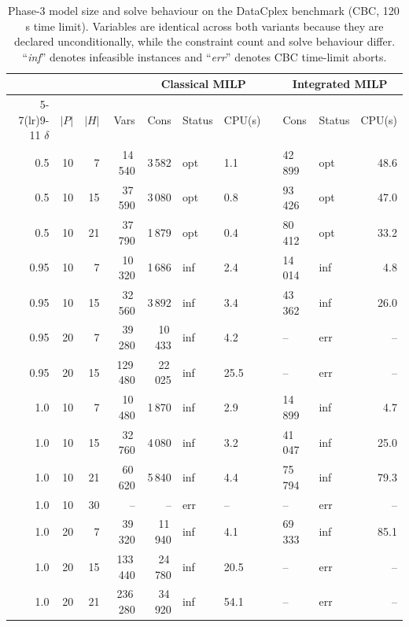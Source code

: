 \begin{table}[t]
\centering\small\setlength{\tabcolsep}{4pt}
\caption{Phase-3 model size and solve behaviour on the DataCplex benchmark
  (CBC, 120\,s time limit).  Variables are identical across both variants
  because they are declared unconditionally, while the constraint count and
  solve behaviour differ.  ``\emph{inf}'' denotes infeasible instances and
  ``\emph{err}'' denotes CBC time-limit aborts.}
\label{tab:phase3_size}
\begin{tabular}{rrrr rll r llr}
\toprule
& & & & \multicolumn{3}{c}{Classical MILP} & & \multicolumn{3}{c}{Integrated MILP} \\
\cmidrule(lr){5-7}\cmidrule(lr){9-11}
$\delta$ & $|P|$ & $|H|$ & Vars & Cons & Status & CPU(s) & & Cons & Status & CPU(s) \\
\midrule
0.5 & 10 &  7 & 14\,540 & 3\,582  & opt & 1.1 & & 42\,899 & opt & 48.6 \\
0.5 & 10 & 15 & 37\,590 & 3\,080  & opt & 0.8 & & 93\,426 & opt & 47.0 \\
0.5 & 10 & 21 & 37\,790 & 1\,879  & opt & 0.4 & & 80\,412 & opt & 33.2 \\
\midrule
0.95& 10 &  7 & 10\,320 & 1\,686  & inf & 2.4 & & 14\,014 & inf &  4.8 \\
0.95& 10 & 15 & 32\,560 & 3\,892  & inf & 3.4 & & 43\,362 & inf & 26.0 \\
0.95& 20 &  7 & 39\,280 & 10\,433 & inf & 4.2 & & --      & err & -- \\
0.95& 20 & 15 & 129\,480& 22\,025 & inf &25.5 & & --      & err & -- \\
1.0 & 10 &  7 & 10\,480 & 1\,870  & inf & 2.9 & & 14\,899 & inf &  4.7 \\
1.0 & 10 & 15 & 32\,760 & 4\,080  & inf & 3.2 & & 41\,047 & inf & 25.0 \\
1.0 & 10 & 21 & 60\,620 & 5\,840  & inf & 4.4 & & 75\,794 & inf & 79.3 \\
1.0 & 10 & 30 & --      & --      & err & --  & & --      & err & -- \\
1.0 & 20 &  7 & 39\,320 & 11\,940 & inf & 4.1 & & 69\,333 & inf & 85.1 \\
1.0 & 20 & 15 & 133\,440& 24\,780 & inf &20.5 & & --      & err & -- \\
1.0 & 20 & 21 & 236\,280& 34\,920 & inf &54.1 & & --      & err & -- \\
\bottomrule
\end{tabular}
\end{table}

